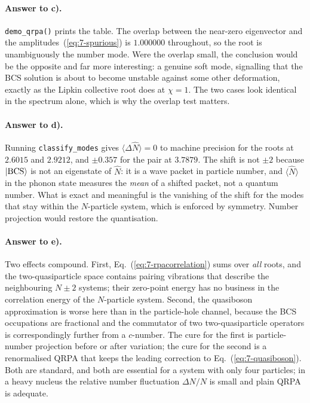 \paragraph{Answer to c).}
\texttt{demo\_qrpa()} prints the table.  The overlap between the near-zero
eigenvector and the amplitudes~(\ref{eq:7-spurious}) is $1.000000$ throughout,
so the root is unambiguously the number mode.  Were the overlap small, the
conclusion would be the opposite and far more interesting: a genuine soft mode,
signalling that the BCS solution is about to become unstable against some
other deformation, exactly as the Lipkin collective root does at $\chi=1$.
The two cases look identical in the spectrum alone, which is why the overlap
test matters.

\paragraph{Answer to d).}
Running \texttt{classify\_modes} gives $\langle\Delta\hat{N}\rangle=0$ to
machine precision for the roots at $2.6015$ and $2.9212$, and
$\pm0.357$ for the pair at $3.7879$.  The shift is not $\pm2$ because
$\vert \mathrm{BCS} \rangle$ is not an eigenstate of $\hat{N}$: it is a wave packet
in particle number, and $\langle\hat{N}\rangle$ in the phonon state measures
the \emph{mean} of a shifted packet, not a quantum number.  What is exact and
meaningful is the vanishing of the shift for the modes that stay within the
$N$-particle system, which is enforced by symmetry.  Number projection would
restore the quantisation.

\paragraph{Answer to e).}
Two effects compound.  First, Eq.~(\ref{eq:7-rpacorrelation}) sums over
\emph{all} roots, and the two-quasiparticle space contains pairing vibrations
that describe the neighbouring $N\pm2$ systems; their zero-point energy has no
business in the correlation energy of the $N$-particle system.  Second, the
quasiboson approximation is worse here than in the particle-hole channel,
because the BCS occupations are fractional and the commutator of two
two-quasiparticle operators is correspondingly further from a $c$-number.  The
cure for the first is particle-number projection before or after variation;
the cure for the second is a renormalised QRPA that keeps the leading
correction to Eq.~(\ref{eq:7-quasiboson}).  Both are standard, and both are
essential for a system with only four particles; in a heavy nucleus the
relative number fluctuation $\Delta N/N$ is small and plain QRPA is adequate.

